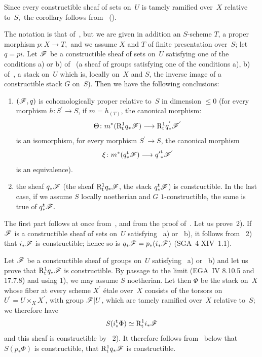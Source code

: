 Since every constructible sheaf of sets on~$U$ is
tamely ramified over~$X$ relative to~$S,$ the
corollary follows from~ (\resp {}).

\begin{corollary}
\label{XIII.2.7}
The notation is that of~, but we are given in addition
an $S$-scheme $T$, a proper morphism $p\colon X\to T,$
and we assume $X$ and $T$ of finite presentation over~$S$; let
$q=pi$. Let $\cal{ F}$ be a constructible sheaf of sets on~$U$
satisfying one of the conditions \textup{a)} or \textup{b)} of~
(\resp a sheaf of groups satisfying one of the conditions
\textup{a)}, \textup{b)} of~, \resp a stack on~$U$ which is, locally on~$X$ and $S$, the inverse image of a constructible stack $G$ on~$S$). Then
we have the following conclusions:
\begin{enumerate}
\item[1)] $(\cal{ F},q)$ is cohomologically proper relative to~$S$ in dimension $\leq 0$ (\resp for every morphism $h\colon
S^{'}\to S$, if $m=h_{(T)}$, the canonical morphism:
$$
\Theta\colon m^*(\R^1_{\tame}q_*\cal{ F})\to
\R^1_{\tame}q_*^{'}\cal{ F}^{'}
$$
is an isomorphism, \resp for every morphism $S^{'}\to S$,
the canonical morphism
$$
\xi \colon m^*(q_*^{\tame}\cal{ F})\to
{q'}_*^{{\tame}}\cal{F}^{'}
$$
is an equivalence).
\item[2)] the sheaf $q_*\cal{ F}$ (\resp the sheaf
$\R_{\tame}^1q_*\cal{ F}$, \resp the stack $q_*^{\tame}\cal{ F}$)
is constructible. In the last case, if we assume $S$ locally
noetherian and $G$ $1$-constructible, the same is true
of $q_*^{\tame}\cal{ F}.$
\end{enumerate}
\end{corollary}

The
first part follows at once from~,
 and from the proof
of~. Let us prove~2). If $\cal{ F}$ is a constructible sheaf
of sets on~$U$ satisfying ~a)
or ~b), it follows from ~2) that
$i_*\cal{ F}$ is constructible; hence so is
$q_*\cal{ F}=p_*(i_*\cal{ F})$ (SGA~4 XIV~1.1).

Let $\cal{F}$ be a constructible sheaf of groups on~$U$
satisfying ~a) or ~b) and let us prove
that $\R_{\tame}^1q_*\cal{ F}$ is constructible. By passage to
the limit (EGA~IV 8.10.5 and 17.7.8) and using 1), we may
assume $S$ noetherian. Let then $\Phi$ be the stack on~$X$ whose
fiber at every scheme $X^{'}$ \'etale over~$X$ consists
of the torsors on~$U^{'}=U\times_{X}X^{'}$, with group $\cal{F}|U$, which
are tamely ramified over~$X$ relative to~$S$; we
therefore have
$$
S(i_*^{\tame}\Phi)\simeq \R_{\tame}^1i_*\cal{ F}
$$
and this sheaf is constructible by ~2).
It therefore follows from~ below that $S(p_*\Phi)$
is constructible, \ie that $\R^1_{\tame}q_*\cal{ F}$ is
constructible.

